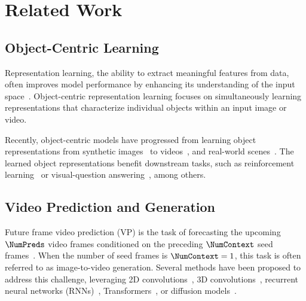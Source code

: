 \section{Related Work}
\subsection{Object-Centric Learning}
Representation learning, the ability to extract meaningful features from data, often improves model performance by enhancing its understanding of the input space~\cite{bengio2013representation}.
%
Object-centric representation learning focuses on simultaneously learning representations that  characterize individual objects within an input image or video.

Recently, object-centric models have progressed from learning object representations from synthetic images~\cite{greff2019multi, lin2020space,
villar2021unsupervised, Locatello_ObjectCentricLearningWithSlotAttention_2020} to videos~\cite{Kipf_ConditionalObjectCentricLearningFromVideo_2022,
Singh_STEVE_2022, elsayed2022savi++}, and real-world scenes~\cite{Seitzer_BridgingTheGapToRealWorldObjectCentricLearning_2023,
aydemir2023self, Zadaianchuk_VideoSaur_2024, kakogeorgiou2024spot}.
%
The learned object representations benefit downstream tasks, such as reinforcement learning~\cite{Mosbach_SOLDReinforcementLearningSlotObjectCentricLatentDynamics} or visual-question answering~\cite{Wu_SlotFormer_2022}, among others.



\subsection{Video Prediction and Generation}

Future frame video prediction (VP) is the task of forecasting the upcoming $\NumPreds$ video frames conditioned on the preceding $\NumContext$ seed frames~\cite{oprea2020review}.
%
When the number of seed frames is $\NumContext=1$, this task is often referred to as image-to-video generation.
%
Several methods have been proposed to address this challenge, leveraging 2D convolutions~\cite{gao2022simvp, chiu2020segmenting}, 3D convolutions~\cite{vondrick2016generating, tulyakov2018mocogan},
recurrent neural networks (RNNs)~\cite{denton2018stochastic, villar2022mspred, wang2022predrnn, guen2020disentangling, franceschi2020stochastic}, Transformers~\cite{rakhimov2020latent, ye2022vptr, ye2023video}, or diffusion models~\cite{hoppe2022diffusion, ho2022video}.



